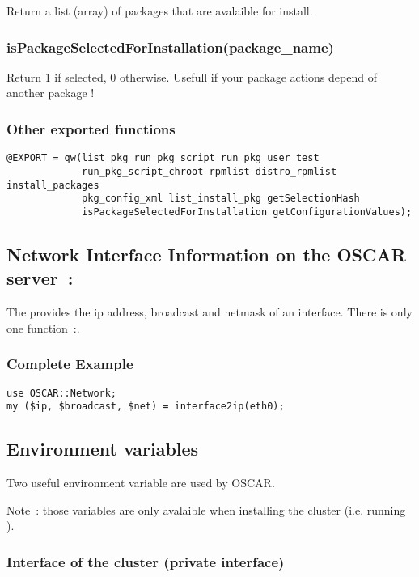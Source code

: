 Return a list (array) of packages that are avalaible for install.

\subsubsection{isPackageSelectedForInstallation(package\_name)}

Return 1 if selected, 0 otherwise. Usefull if your package actions depend of
another package !

\subsubsection{Other exported functions}

\begin{verbatim}
@EXPORT = qw(list_pkg run_pkg_script run_pkg_user_test
             run_pkg_script_chroot rpmlist distro_rpmlist install_packages
             pkg_config_xml list_install_pkg getSelectionHash
             isPackageSelectedForInstallation getConfigurationValues);
\end{verbatim}

\subsection{Network Interface Information on the OSCAR server~: }

The  provides the ip address, broadcast and netmask
of an interface. There is only one function~:.

\subsubsection{Complete Example}

\begin{verbatim}
use OSCAR::Network;
my ($ip, $broadcast, $net) = interface2ip(eth0);
\end{verbatim}

\subsection{Environment variables}

Two useful environment variable are used by OSCAR. 

Note~: those variables are only avalaible when installing the cluster (i.e. running
).

\subsubsection{Interface of the cluster (private interface)}

